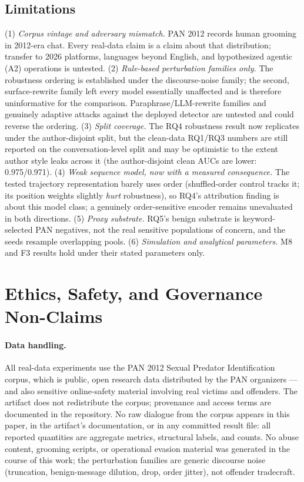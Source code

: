 \documentclass[11pt]{article}
\begin{document}
\subsection{Limitations}
\label{sec:limitations}
(1) \emph{Corpus vintage and adversary mismatch.} PAN 2012 records human grooming in 2012-era chat. Every real-data claim is a claim about that distribution; transfer to 2026 platforms, languages beyond English, and hypothesized agentic (A2) operations is untested. (2) \emph{Rule-based perturbation families only.} The robustness ordering is established under the discourse-noise family; the second, surface-rewrite family left every model essentially unaffected and is therefore uninformative for the comparison. Paraphrase/LLM-rewrite families and genuinely adaptive attacks against the deployed detector are untested and could reverse the ordering. (3) \emph{Split coverage.} The RQ4 robustness result now replicates under the author-disjoint split, but the clean-data RQ1/RQ3 numbers are still reported on the conversation-level split and may be optimistic to the extent author style leaks across it (the author-disjoint clean AUCs are lower: 0.975/0.971). (4) \emph{Weak sequence model, now with a measured consequence.} The tested trajectory representation barely uses order (shuffled-order control tracks it; its position weights slightly \emph{hurt} robustness), so RQ4's attribution finding is about this model class; a genuinely order-sensitive encoder remains unevaluated in both directions. (5) \emph{Proxy substrate.} RQ5's benign substrate is keyword-selected PAN negatives, not the real sensitive populations of concern, and the seeds resample overlapping pools. (6) \emph{Simulation and analytical parameters.} M8 and F3 results hold under their stated parameters only.

\section{Ethics, Safety, and Governance Non-Claims}
\label{sec:ethics}

\paragraph{Data handling.}
All real-data experiments use the PAN 2012 Sexual Predator Identification corpus, which is public, open research data distributed by the PAN organizers --- and also sensitive online-safety material involving real victims and offenders. The artifact does not redistribute the corpus; provenance and access terms are documented in the repository. No raw dialogue from the corpus appears in this paper, in the artifact's documentation, or in any committed result file: all reported quantities are aggregate metrics, structural labels, and counts. No abuse content, grooming scripts, or operational evasion material was generated in the course of this work; the perturbation families are generic discourse noise (truncation, benign-message dilution, drop, order jitter), not offender tradecraft.
\end{document}
